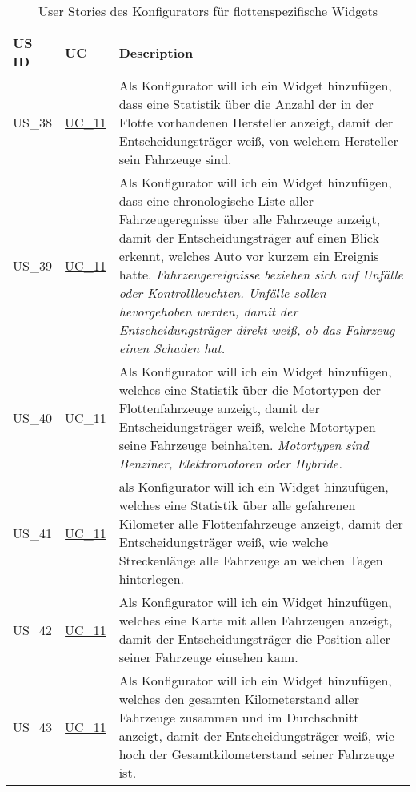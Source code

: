   \label{FlottenWidgets}
  \sffamily
  \begin{footnotesize}
    \begin{longtable}[L L L]{ p{} p{} p{} }
      \caption                       %
          {User Stories des Konfigurators für flottenspezifische Widgets} %
          \\
      \toprule
      \textbf{US ID} & \textbf{UC} & \textbf{Description} \\
      \midrule
      \hypertarget{Ref:US38}{US\_38} & \hyperlink{Ref:UC11}{UC\_11} & Als Konfigurator will ich ein Widget hinzufügen, dass eine Statistik über die Anzahl der in der Flotte vorhandenen Hersteller anzeigt, damit der Entscheidungsträger weiß, von welchem Hersteller sein Fahrzeuge sind. \\
      \hypertarget{Ref:US39}{US\_39} & \hyperlink{Ref:UC11}{UC\_11} & Als Konfigurator will ich ein Widget hinzufügen, dass eine chronologische Liste aller Fahrzeugeregnisse über alle Fahrzeuge anzeigt, damit der Entscheidungsträger auf einen Blick erkennt, welches Auto vor kurzem ein Ereignis hatte.
      \newline\newline
      \emph{Fahrzeugereignisse beziehen sich auf Unfälle oder Kontrollleuchten. Unfälle sollen hevorgehoben werden, damit der Entscheidungsträger direkt weiß, ob das Fahrzeug einen Schaden hat.}\\
      \hypertarget{Ref:US40}{US\_40} & \hyperlink{Ref:UC11}{UC\_11} & Als Konfigurator will ich ein Widget hinzufügen, welches eine Statistik über die Motortypen der Flottenfahrzeuge anzeigt, damit der Entscheidungsträger weiß, welche Motortypen seine Fahrzeuge beinhalten. 
      \newline\newline
      \emph{Motortypen sind Benziner, Elektromotoren oder Hybride.}\\
      \hypertarget{Ref:US41}{US\_41} & \hyperlink{Ref:UC11}{UC\_11} & als Konfigurator will ich ein Widget hinzufügen, welches eine Statistik über alle gefahrenen Kilometer alle Flottenfahrzeuge anzeigt, damit der Entscheidungsträger weiß, wie welche Streckenlänge alle Fahrzeuge an welchen Tagen hinterlegen. \\
      \hypertarget{Ref:US42}{US\_42} & \hyperlink{Ref:UC11}{UC\_11} & Als Konfigurator will ich ein Widget hinzufügen, welches eine Karte mit allen Fahrzeugen anzeigt, damit der Entscheidungsträger die Position aller seiner Fahrzeuge einsehen kann. \\
      \hypertarget{Ref:US43}{US\_43} & \hyperlink{Ref:UC11}{UC\_11} & Als Konfigurator will ich ein Widget hinzufügen, welches den gesamten Kilometerstand aller Fahrzeuge zusammen und im Durchschnitt anzeigt, damit der Entscheidungsträger weiß, wie hoch der Gesamtkilometerstand seiner Fahrzeuge ist. \\
      \bottomrule
    \end{longtable}
  \end{footnotesize}
  \rmfamily

      
